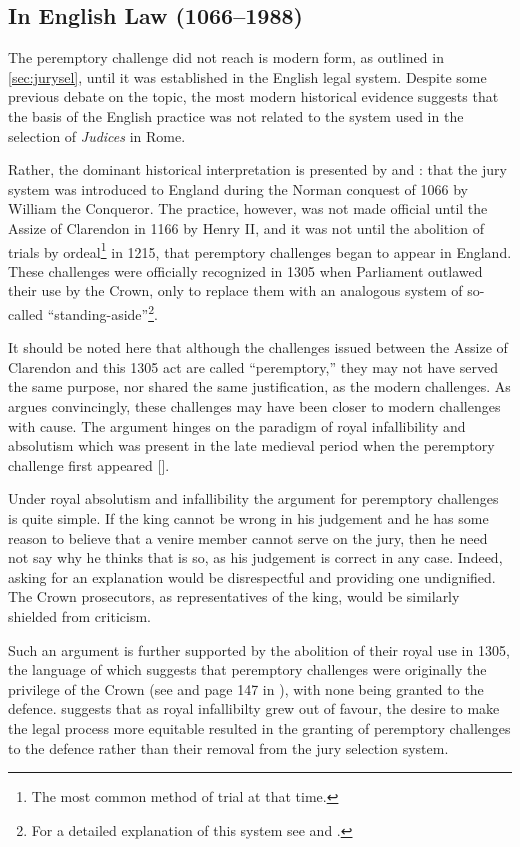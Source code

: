 \subsection{In English Law (1066--1988)}

The peremptory challenge did not reach is modern form, as outlined in \ref{sec:jurysel}, until it was established in the English legal
system. Despite some previous debate on the topic, the most modern historical evidence suggests that the
basis of the English practice was not related to the system used in the selection of \textit{Judices} in Rome.

Rather, the dominant historical interpretation is presented by \cite{vonmosch1921} and \cite{hoffman1997}: that the jury system
was introduced to England during the Norman conquest of 1066 by William the Conqueror. The practice, however, was not made
official until the Assize of Clarendon in 1166 by Henry II, and it was not until the abolition of trials by ordeal\footnote{The
  most common method of trial at that time.} in 1215, that peremptory challenges began to appear in England. These challenges
were officially recognized in 1305 when Parliament outlawed their use by the Crown, only to replace them with an analogous system
of so-called ``standing-aside''\footnote{For a detailed explanation of this system see \cite{hoffman1997} and \cite{brown2000}.}.

It should be noted here that although the challenges issued between the Assize of Clarendon and this 1305 act are called
``peremptory,'' they may not have served the same purpose, nor shared the same justification, as the modern challenges. As
\cite{hoffman1997} argues convincingly, these challenges may have been closer to modern challenges with cause. The argument hinges 
on the paradigm of royal infallibility and absolutism which was present in the late medieval period when the peremptory challenge
first appeared [\cite{burgess1992}].

Under royal absolutism and infallibility the argument for peremptory challenges is quite simple. If the king cannot be wrong in
his judgement and he has some reason to believe that a venire member
cannot serve on the jury, then he need not say why he thinks
that is so, as his judgement is correct in any case. Indeed, asking for an explanation would be disrespectful and providing one
undignified. The Crown prosecutors, as representatives of the king, would be similarly shielded from criticism.

Such an argument is further supported by the abolition of their royal
use in 1305, the language of which suggests that peremptory
challenges were originally the privilege of the Crown (see \cite{hoffman1997} and page 147 in \cite{vandykejurysel}), with none
being granted to the defence. \cite{hoffman1997} suggests that as royal infallibilty grew out of favour, the desire to make the
legal process more equitable resulted in the granting of peremptory challenges to the defence rather than their removal from the
jury selection system.

